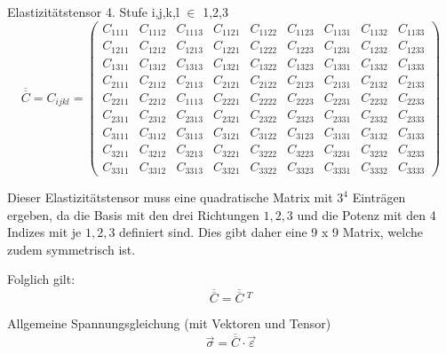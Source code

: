 Elastizitätstensor 4. Stufe i,j,k,l $\in$ {1,2,3}
\[
\overline\overline{C}
=
C_{ijkl}
=
\begin{pmatrix}
C_{1111} & C_{1112} & C_{1113} & C_{1121} & C_{1122} & C_{1123} & C_{1131} & C_{1132} & C_{1133} \\
C_{1211} & C_{1212} & C_{1213} & C_{1221} & C_{1222} & C_{1223} & C_{1231} & C_{1232} & C_{1233} \\
C_{1311} & C_{1312} & C_{1313} & C_{1321} & C_{1322} & C_{1323} & C_{1331} & C_{1332} & C_{1333} \\
C_{2111} & C_{2112} & C_{2113} & C_{2121} & C_{2122} & C_{2123} & C_{2131} & C_{2132} & C_{2133} \\
C_{2211} & C_{2212} & C_{1113} & C_{2221} & C_{2222} & C_{2223} & C_{2231} & C_{2232} & C_{2233} \\
C_{2311} & C_{2312} & C_{2313} & C_{2321} & C_{2322} & C_{2323} & C_{2331} & C_{2332} & C_{2333} \\
C_{3111} & C_{3112} & C_{3113} & C_{3121} & C_{3122} & C_{3123} & C_{3131} & C_{3132} & C_{3133} \\
C_{3211} & C_{3212} & C_{3213} & C_{3221} & C_{3222} & C_{3223} & C_{3231} & C_{3232} & C_{3233} \\
C_{3311} & C_{3312} & C_{3313} & C_{3321} & C_{3322} & C_{3323} & C_{3331} & C_{3332} & C_{3333}
\end{pmatrix}
\]

Dieser Elastizitätstensor muss eine quadratische Matrix mit $3^{4}$ Einträgen ergeben,
da die Basis mit den drei Richtungen $1, 2, 3$ und die Potenz mit den 4 Indizes mit je $1, 2, 3$ definiert sind.
Dies gibt daher eine 9 x 9 Matrix, welche zudem symmetrisch ist.

Folglich gilt:
\[
\overline{\overline{C}}
=
\overline{\overline{C}}~^{T}
\]

Allgemeine Spannungsgleichung (mit Vektoren und Tensor)
\[
\vec\sigma
=
\overline{\overline{C}}\cdot\vec{\varepsilon}
\]

